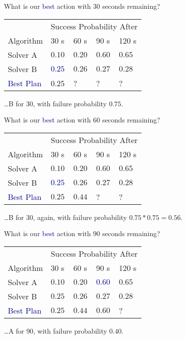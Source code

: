 \begin{frame}
What is our \textcolor{darkblue}{best} action with $30$ seconds remaining?

\begin{center}
\begin{tabular}{lllll}
\toprule
& \multicolumn{4}{l}{Success Probability After}\\
\cmidrule{2-5}
Algorithm & 30 s & 60 s & 90 s & 120 s\\
\midrule
Solver A & $0.10$ & $0.20$ & $0.60$ & $0.65$\\
Solver B & \textcolor{darkblue}{$0.25$} & $0.26$ & $0.27$ & $0.28$\\
\textcolor{darkblue}{Best Plan} & 0.25 & ? & ? & ?\\
\bottomrule
\end{tabular}
\end{center}

\dots B for 30, with failure probability $0.75$.
\end{frame}

\begin{frame}
What is our \textcolor{darkblue}{best} action with $60$ seconds remaining?

\begin{center}
\begin{tabular}{lllll}
\toprule
& \multicolumn{4}{l}{Success Probability After}\\
\cmidrule{2-5}
Algorithm & 30 s & 60 s & 90 s & 120 s\\
\midrule
Solver A & $0.10$ & $0.20$ & $0.60$ & $0.65$\\
Solver B & \textcolor{darkblue}{$0.25$} & $0.26$ & $0.27$ & $0.28$\\
\textcolor{darkblue}{Best Plan} & $0.25$ & $0.44$ & ? & ?\\
\bottomrule
\end{tabular}
\end{center}

\dots B for 30, again, with failure probability $0.75 * 0.75 = 0.56$.
\end{frame}

\begin{frame}
What is our \textcolor{darkblue}{best} action with $90$ seconds remaining?

\begin{center}
\begin{tabular}{lllll}
\toprule
& \multicolumn{4}{l}{Success Probability After}\\
\cmidrule{2-5}
Algorithm & 30 s & 60 s & 90 s & 120 s\\
\midrule
Solver A & $0.10$ & $0.20$ & \textcolor{darkblue}{$0.60$} & $0.65$\\
Solver B & $0.25$ & $0.26$ & $0.27$ & $0.28$\\
\textcolor{darkblue}{Best Plan} & $0.25$ & $0.44$ & $0.60$ & ?\\
\bottomrule
\end{tabular}
\end{center}

\dots A for 90, with failure probability $0.40$.
\end{frame}

